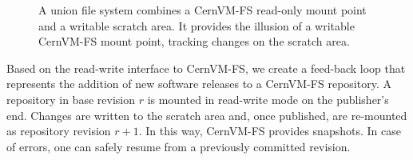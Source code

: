 \begin{figure}
	\begin{center}
		\resizebox{0.5\textwidth}{!}{}
	\end{center}
	\label{fig:overlay}
	\caption{A union file system combines a CernVM-FS read-only mount point and a writable scratch area.  
		It provides the illusion of a writable CernVM-FS mount point, tracking changes on the scratch area.}
\end{figure}

Based on the read-write interface to CernVM-FS, we create a feed-back loop that represents the addition of new software releases to a CernVM-FS repository.
A repository in base revision $r$ is mounted in read-write mode on the publisher's end.
Changes are written to the scratch area and, once published, are re-mounted as repository revision $r+1$.
In this way, CernVM-FS provides snapshots. 
In case of errors, one can safely resume from a previously committed revision.
